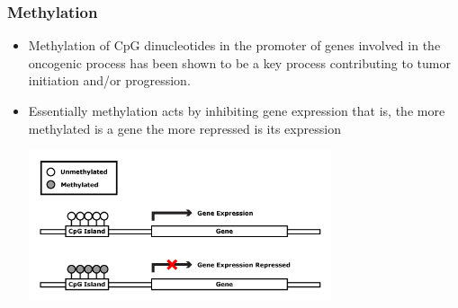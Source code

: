 \documentclass[handout]{beamer}
\begin{document}
\begin{frame}[fragile]\frametitle{Methylation}
\begin{itemize}
\item Methylation of CpG dinucleotides in the promoter of genes
  involved in the oncogenic process has been shown to be a key process
  contributing to tumor initiation and/or progression.
\item Essentially methylation acts by inhibiting gene expression that
  is, the more methylated is a gene the more repressed is its
  expression
\begin{center}
\includegraphics[width=0.7\textwidth]{./images/methylationAction1.png}
\end{center}
\end{itemize} 
\end{frame}
\end{document}
